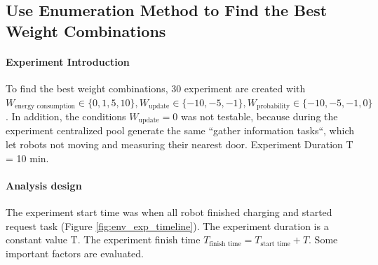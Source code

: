 \subsection{Use Enumeration Method to Find the Best Weight Combinations}
\label{sec:gather_info_experiment_enumerate}
\paragraph{Experiment Introduction} 
To find the best weight combinations, 30 experiment are created with $W_{\mbox{energy consumption}} \in \{ 0,1,5,10 \}, W_{\mbox{update}} \in \{-10,-5,-1\}, W_{\mbox{probability}} \in \{-10,-5,-1,0\}$. In addition, the conditions $W_{\mbox{update}}=0$ was not testable, because during the experiment centralized pool generate the same ``gather information tasks``, which let robots not moving and measuring their nearest door. Experiment Duration T = 10 min.


\paragraph{Analysis design} The experiment start time was when all robot finished charging and started request task (Figure \ref{fig:env_exp_timeline}). The experiment duration is a constant value T. The experiment finish time $T_{\mbox{finish time}} = T_{\mbox{start time}} + T $. Some important factors are evaluated. 

